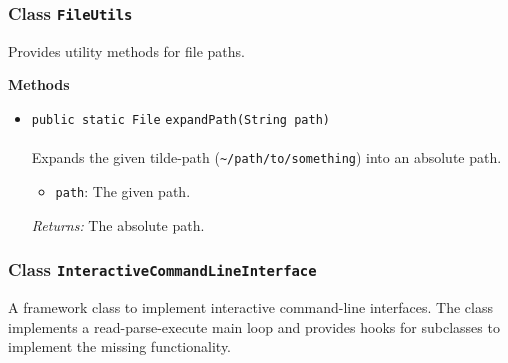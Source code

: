 \subsubsection{Class \lstinline|FileUtils|}
Provides utility methods for file paths. \\
\noindent\begin{minipage}[t]{5cm}
\vspace{0.3em}
\hspace*{2em}
\vspace{0.3em}
\end{minipage}





\textbf{\sffamily Methods}
\begin{itemize}
\item \lstinline|public static File| \lstinline|expandPath|\lstinline|(String path)|\\ \\[-0.6em]
Expands the given tilde-path (\lstinline|~/path/to/something|) into an absolute path.
\begin{itemize}
\item \lstinline|path|: The given path.
\end{itemize}

\emph{Returns:} The absolute path.

\end{itemize}

\subsubsection{Class \lstinline|InteractiveCommandLineInterface|}
A framework class to implement interactive command-line interfaces. The class implements
 a read-parse-execute main loop and provides hooks for subclasses to implement the missing
 functionality. \\
\noindent\begin{minipage}[t]{5cm}
\vspace{0.3em}
\hspace*{2em}
\vspace{0.3em}
\end{minipage}



